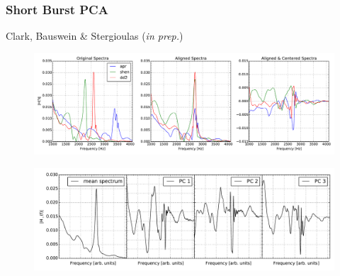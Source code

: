 \documentclass[serif,mathserif,10pt]{beamer}
\let\oldframetitle\frametitle%
\renewcommand{\frametitle}[1]{%
      \oldframetitle{#1}\setstretch{1.2}}
\begin{document}
\begin{frame}
    \frametitle{Short Burst PCA}
    Clark, Bauswein \& Stergioulas (\emph{in prep.})

    \begin{figure}
        \centering
        \includegraphics[width=\columnwidth]{figures/spectrum_conditioning_demo.pdf}
    \end{figure}

    \begin{figure}
        \centering
        \includegraphics[width=\columnwidth]{figures/magnitude_pcs.pdf}
    \end{figure}

\end{frame}
\end{document}
